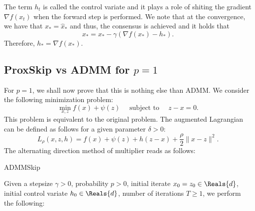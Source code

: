 \begin{itemize}
\begin{algorithm}
\begin{algorithmic}


\Else
    
\EndIf 

\EndFor
\end{algorithmic}
\end{algorithm}
 

\begin{remark}
The term $h_t$ is called the control variate and it plays a role of shiting the gradient $\nabla f(x_t)$ when the forward step is performed. We note that at the convergence, we have that $x_* = \widehat{x}_*$ and thus, the consensus is achieved and it holds that 
\begin{equation}
x_* = x_* - \gamma (\nabla f(x_*) - h_*).
\end{equation}
Therefore, $h_* = \nabla f(x_*).$
\end{remark}

\subsection{ProxSkip vs ADMM for $p=1$} 

For $p = 1$, we shall now prove that this is nothing else than ADMM. We consider the following minimization problem: 
\begin{equation} 
\min_{x,z} f(x) + \psi(z) \quad \mbox{ subject to } \quad z - x = 0. 
\end{equation}
This problem is equivalent to the original problem. The augmented Lagrangian can be defined as follows for a given parameter $\delta > 0$: 
\begin{equation} 
L_\rho(x,z,h) = f(x) + \psi(z) + h (z - x) + \frac{\rho}{2} \|x-z\|^2. 
\end{equation}
The alternating direction method of multiplier reads as follows: 
\begin{algorithm}
\caption{ADMMSkip}\label{alg:ADMMSkip}
Given a stepsize $\gamma > 0$, probability $p > 0$, initial iterate $x_0 = z_0 \in \Reals{d}$, initial control variate $h_0 \in \Reals{d}$, number of iterations $T \geq 1$, we perform the following:  
\begin{algorithmic}


\end{algorithmic}
\end{algorithm}
\end{itemize}
